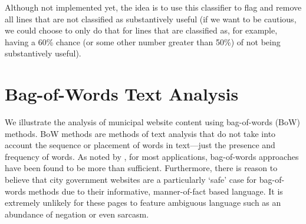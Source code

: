 \documentclass[11pt]{article}
\begin{document}


%

%

Although not implemented yet, the idea is to use this classifier to flag and remove all lines that are not classified as substantively useful (if we want to be cautious, we could choose to only do that for lines that are classified as, for example, having a 60\% chance (or some other number greater than 50\%) of not being substantively useful).

\section{Bag-of-Words Text Analysis}

We illustrate the analysis of municipal website content using bag-of-words (BoW) methods. BoW methods are methods of text analysis that do not take into account the sequence or placement of words in text---just the presence and frequency of words. As noted by \cite{GrimmerStewart2013}, for most applications, bag-of-words approaches have been found to be more than sufficient. Furthermore, there is reason to believe that city government websites are a particularly `safe' case for bag-of-words methods due to their informative, manner-of-fact based language. It is extremely unlikely for these pages to feature ambiguous language such as an abundance of negation or even sarcasm.
\end{document}

